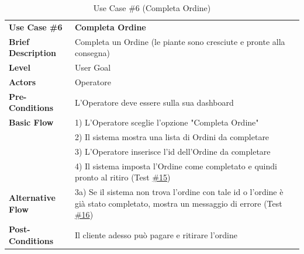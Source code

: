 \documentclass{article}
\begin{document}
    
    \begin{table}[p]
        \begin{tabularx}{\textwidth}{ | l  X | }
            \rowcolor{lightgray!70}
            \hline
            \textbf{Use Case \#6} & \textbf{Completa Ordine} \\[0.5ex]
            \textbf{Brief Description} & Completa un Ordine (le piante sono cresciute e pronte alla consegna)\\
            \rowcolor{blue!10}
            \textbf{Level} & User Goal \\
            \textbf{Actors} & Operatore \\
            \rowcolor{blue!10}
            \textbf{Pre-Conditions} & L'Operatore deve essere sulla sua dashboard\\
            \textbf{Basic Flow} & 1) L'Operatore sceglie l'opzione "Completa Ordine"\\
            & 2) Il sistema mostra una lista di Ordini da completare\\
            & 3) L'Operatore inserisce l'id dell'Ordine da completare\\
            & 4) Il sistema imposta l'Ordine come completato e quindi pronto al ritiro (Test \hyperref[test_15]{\#15})\\
            \rowcolor{blue!10}
           \textbf{Alternative Flow} & 3a) Se il sistema non trova l'ordine con tale id o l'ordine è già stato completato, mostra un messaggio di errore (Test \hyperref[test_16]{\#16})\\
            \textbf{Post-Conditions} & Il cliente adesso può pagare e ritirare l'ordine\\
            \hline
        \end{tabularx}
        \label{use_case_6}
        \caption{Use Case \#6 (Completa Ordine)}
    \end{table}
    
    
    
\end{document}
